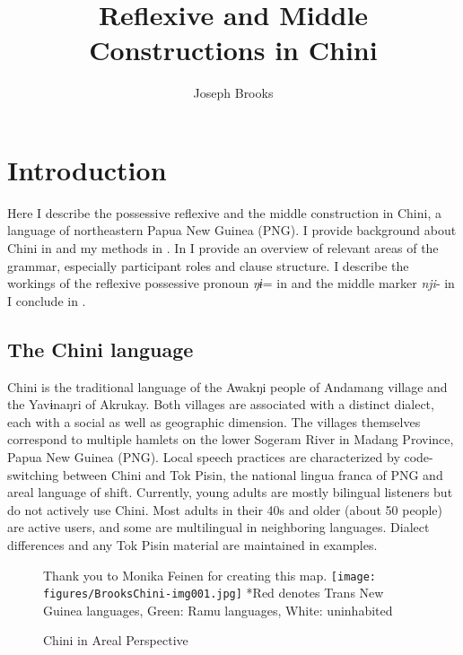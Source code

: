 \documentclass[output=paper]{langscibook}
\author{Joseph Brooks\affiliation{University of California, Santa Barbara}\orcid{}}
\title{Reflexive and Middle Constructions in Chini}
\begin{document}
\maketitle 


\section{Introduction}\label{sec:brooks:1}

Here I describe the possessive reflexive and the middle construction in Chini, a language of northeastern Papua New Guinea (PNG). I provide background about Chini in  and my methods in . In  I provide an overview of relevant areas of the grammar, especially participant roles and clause structure. I describe the workings of the reflexive possessive pronoun \textit{ŋɨ}= in  and the middle marker \textit{nji}- in  I conclude in .

\subsection{{The} {Chini} {language}}\label{sec:brooks:1.1}

Chini is the traditional language of the Awakŋi people of Andamang village and the Yavɨnaŋri of Akrukay. Both villages are associated with a distinct dialect, each with a social as well as geographic dimension. The villages themselves correspond to multiple hamlets on the lower Sogeram River in Madang Province, Papua New Guinea (PNG). Local speech practices are characterized by code-switching between Chini and Tok Pisin, the national lingua franca of PNG and areal language of shift. Currently, young adults are mostly bilingual listeners but do not actively use Chini. Most adults in their 40s and older (about 50 people) are active users, and some are multilingual in neighboring languages. Dialect differences and any Tok Pisin material are maintained in examples.

\begin{figure}
\caption{Chini in Areal Perspective}
{Thank you to Monika Feinen for creating this map.}
\texttt{[image: figures/BrooksChini-img001.jpg]}
\label{fig:brooks:1}
*Red denotes Trans New Guinea languages, Green: Ramu languages, White: uninhabited
\end{figure}
\end{document}
